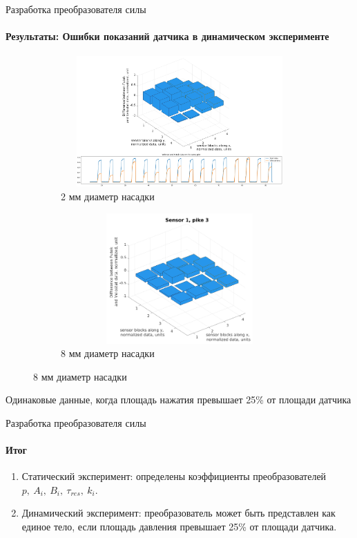 \documentclass[aspectratio=169,xcolor=table]{beamer}
\begin{document}
\begin{frame}[t]{Разработка преобразователя силы}
    \framesubtitle{Результаты: Ошибки показаний датчика в динамическом эксперименте}
    \vspace{-15pt}
    \begin{figure}[H]
        \begin{subfigure}{0.64\textwidth}
            \centering\includegraphics[height=5cm,width=1\textwidth,keepaspectratio]{sens1_pike1_mod.png}
            \caption*{2 мм диаметр насадки}
            \label{fig:sens1_pike1}
        \end{subfigure}
        \begin{subfigure}{0.34\textwidth}
            \centering\includegraphics[height=5cm,width=1\textwidth,keepaspectratio]{sens1_pike3.png}
            \caption*{8 мм диаметр насадки}
            \label{fig:sens1_pike3}
        \end{subfigure}
    \end{figure}
    \vspace{-0.8cm}
    \alert{Одинаковые данные, когда площадь нажатия превышает 25\% от площади датчика}
\end{frame}

\begin{frame}[t]{Разработка преобразователя силы}
    \framesubtitle{Итог}
    \vspace{-15pt}
    {\large
    \begin{enumerate}
        \item Статический эксперимент: определены коэффициенты преобразователей $p,\ A_i,\ B_i,\ \tau_{res},\ k_i$.
        \item Динамический эксперимент: преобразователь может быть представлен как единое тело, если площадь давления превышает 25\% от площади датчика.
    \end{enumerate}
    }
\end{frame}
\end{document}
